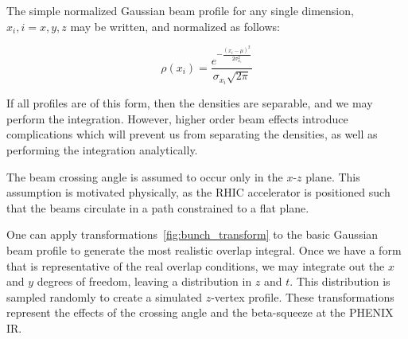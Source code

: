 The simple normalized Gaussian beam profile for any single dimension, $x_i, i=x,
y, z$  may be written, and normalized as follows:

\begin{equation}
\label{eq:simplegaussian}
\rho(x_{i}) = \frac{e^{ -\frac{(x_{i}-\mu)^2}{2\sigma_{x_i}^2}}}{\sigma_{x_i}\sqrt{2\pi}}
\end{equation}

{\noindent}If all profiles are of this form, then the densities are separable,
and we may perform the integration. However, higher order beam effects introduce
complications which will prevent us from separating the densities, as well as
performing the integration analytically.

The beam crossing angle is assumed to occur only in the $x$-$z$ plane. This
assumption is motivated physically, as the RHIC accelerator is positioned such
that the beams circulate in a path constrained to a flat plane. 

One can apply transformations~\ref{fig:bunch_transform} to the basic Gaussian
beam profile to generate the most realistic overlap integral. Once we have a
form that is representative of the real overlap conditions, we may integrate out
the $x$ and $y$ degrees of freedom, leaving a distribution in $z$ and $t$. This
distribution is sampled randomly to create a simulated $z$-vertex profile. These
transformations represent the effects of the crossing angle and the beta-squeeze
at the PHENIX IR.


